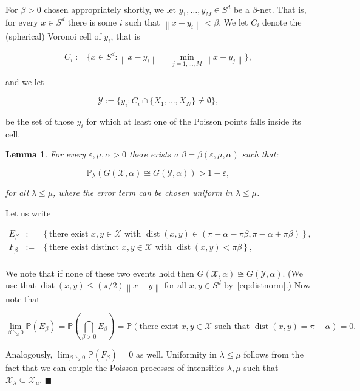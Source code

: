 \documentclass[11pt]{article}%
\newenvironment{proof}{\vspace{1ex}\noindent{\bf Proof.}}{\hspace*{\fill}$\blacksquare$\vspace{1ex}}
\newtheorem{lemma}[lemma]{Lemma}
\newcommand{\Xcal}[0]{\ensuremath{{\mathcal X}}}
\newcommand{\Ycal}[0]{\ensuremath{{\mathcal Y}}}
\newcommand{\norm}[1]{\ensuremath{\left\|#1\right\|}}
\newcommand{\Pee}[0]{\ensuremath{{\mathbb P}}}
\newcommand{\eps}{\varepsilon}
\DeclareMathOperator{\dist}{dist}
\begin{document}
For $\beta > 0$ chosen appropriately shortly, we let $y_1,\dots,y_M \in S^d$ be
a $\beta$-net. That is, for every $x \in S^d$ there is 
some $i$ such that $\norm{x-y_i} < \beta$.
We let $C_i$ denote the (spherical) Voronoi cell of $y_i$, that is 

$$ C_i := \{ x\in S^d : \norm{x-y_i} = \min_{j=1,\dots,M} \norm{x-y_j} \}, $$

\noindent 
and we let 

$$ \Ycal := \{ y_i : C_i \cap \{X_1,\dots,X_N\} \neq \emptyset \}, $$

\noindent
be the set of those $y_i$ for which at least one of the Poisson points falls inside its cell.

\begin{lemma}\label{lem:aprevlem}
For every $\eps, \mu, \alpha > 0$ there exists a
$\beta=\beta(\eps,\mu,\alpha)$ such that:
 
 $$ \Pee_\lambda\left( G(\Xcal,\alpha) \cong G(\Ycal,\alpha) \right) > 1-\eps, $$
 
 \noindent
 for all $\lambda \leq \mu$, where the error term can be chosen uniform in $\lambda \leq \mu$.
\end{lemma}

\begin{proof}
Let us write 

$$ \begin{array}{rcl} 
E_\beta & := & \left\{\text{there exist $x,y\in\Xcal$ with $\dist(x,y) \in (\pi-\alpha-\pi\beta,\pi-\alpha+\pi\beta)$}\right\}, \\
F_\beta & := & \left\{\text{there exist distinct $x,y\in\Xcal$ with $\dist(x,y) < \pi\beta$}\right\}, \\
\end{array} $$

\noindent
We note that if none of these two events hold then $G(\Xcal,\alpha) \cong G(\Ycal,\alpha)$.
(We use that $\dist(x,y) \leq (\pi/2)\norm{x-y}$ for all $x,y\in S^d$ by~\eqref{eq:distnorm}.)
Now note that 

$$ 
\lim_{\beta\searrow 0} \Pee( E_{\beta} ) 
= \Pee\left( \bigcap_{\beta>0} E_{\beta} \right)
= \Pee\left(\text{there exist $x,y\in \Xcal$ such that $\dist(x,y) = \pi-\alpha$}\right) = 0. $$

Analogously, $\lim_{\beta\searrow 0} \Pee( F_{\beta} ) = 0$ as well.
Uniformity in $\lambda \leq \mu$ follows from the fact that we can 
couple the Poisson processes of intensities $\lambda, \mu$ such that 
$\Xcal_\lambda \subseteq \Xcal_\mu$.
% 
\end{proof}
\end{document}
